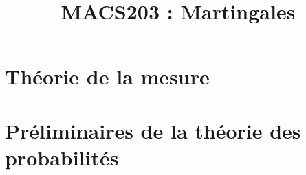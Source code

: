 \documentclass[a4paper,9pt]{article}
\title{\vspace{-1.2cm} \textbf{MACS203 : Martingales}}
\begin{document}
\maketitle

\vspace{-1.5cm}

\section{Théorie de la mesure}

	

\section{Préliminaires de la théorie des probabilités}

	
\end{document}

